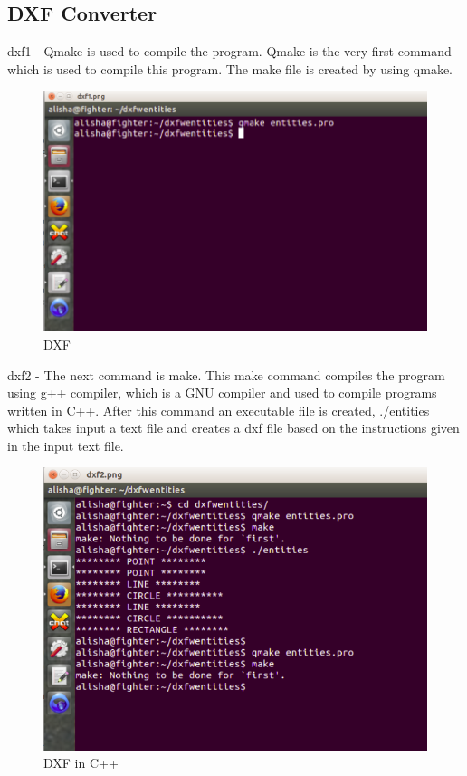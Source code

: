 \subsection{DXF Converter}
dxf1 - Qmake is used to compile the program. Qmake is the very first command which is used to compile this program. The make file is created by using qmake.
\begin{figure} [h!]
\centering
\includegraphics[scale=0.2]{images/dxf1.png}
\caption{DXF }
\end{figure}
dxf2 - The next command is make. This make command compiles the program using g++ compiler, which is a GNU compiler and used to compile programs written in C++. After this command an executable file is created, ./entities which takes input a text file and creates a dxf file based on the instructions given in the input text file.
\begin{figure} [h!]
\centering
\includegraphics[scale=0.2]{images/dxf2.png}
\caption{DXF in C++ }
\end{figure}

